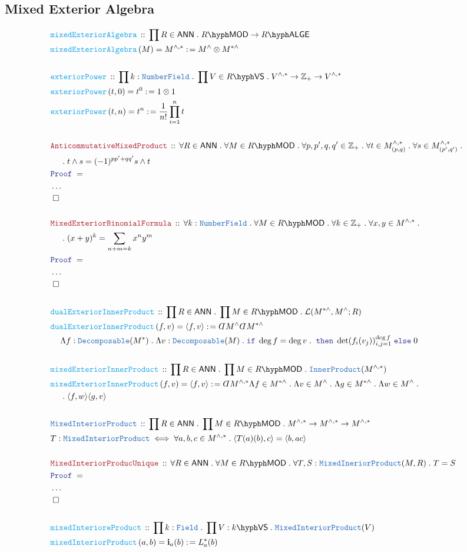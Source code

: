 \documentclass[12pt]{scrartcl}%
\newcommand{\TYPE}[1]{\textcolor{NavyBlue}{\mathtt{#1}}}%
\newcommand{\FUNC}[1]{\textcolor{Cerulean}{\mathtt{#1}}}%
\newcommand{\LOGIC}[1]{\textcolor{Blue}{\mathtt{#1}}}%
\newcommand{\THM}[1]{\textcolor{Maroon}{\mathtt{#1}}}%
\renewcommand{\.}{\; . \;} %
\newcommand{\de}{: \kern 0.1pc =} %
\newcommand{\If}{\LOGIC{if} \;} %
\newcommand{\Then}{ \; \LOGIC{then} \;} %
\newcommand{\Else}{\; \LOGIC{else} \;} %
\newcommand{\Act}[1]{\left( #1 \right)} %
\newcommand{\Theorem}[2]{& \THM{#1} \, :: \, #2 \\ & \Proof = \\ } %
\newcommand{\DeclareType}[2]{& \TYPE{#1} \, :: \, #2 \\}%
\newcommand{\DefineType}[3]{& #1 : \TYPE{#2} \iff #3 \\}%
\newcommand{\DeclareFunc}[2]{& \FUNC{#1} \, :: \, #2 \\}%
\newcommand{\DefineNamedFunc}[4]{&  \FUNC{#1}\Act{#2} = #3 \de #4 \\}%
\newcommand{\NewLine}{\\ & \kern 1pc}%
\newcommand{\Page}[1]{ \begin{align*} #1 \end{align*}  }%
\newcommand{ \bd }{ \ByDef }%
\newcommand{\NoProof}{ & \ldots \\ \EndProof}%
\newcommand{\Int}{\mathbb{Z}}%
\newcommand{\QED}{\; \square} %
\newcommand{\EndProof}{& \QED \\} %
\newcommand{\ByDef}{\rotatebox[origin=c]{-180}{$D$}}%
\newcommand{\Proof}{\LOGIC{Proof} \; } %
\newcommand{\VS}[1]{#1\hyph\mathsf{VS}} %
\newcommand{\LMOD}[1]{#1\hyph\mathsf{MOD}} %
\renewcommand{\L}{\mathcal{L}}
\newcommand{\Field}{\TYPE{Field}}
\newcommand{\ANN}{\mathsf{ANN}} %
\newcommand{\LALGE}[1]{#1\hyph\mathsf{ALGE}}%
\begin{document}
\subsection{Mixed Exterior Algebra}
\Page{
	\DeclareFunc{mixedExteriorAlgebra}{\prod R \in \ANN \. \LMOD{R} \to \LALGE{R}}
	\DefineNamedFunc{mixedExteriorAlgebra}{M}{M^{\wedge,*}}{ M^\wedge \otimes M^{*\wedge} }
	\\
	\DeclareFunc{exteriorPower}{\prod k  : \TYPE{NumberField}  \. \prod V \in \VS{R} \.  V^{\wedge,*} \to \Int_+ \to V^{\wedge,*}}
	\DefineNamedFunc{exteriorPower}{t,0}{t^0}{1\otimes 1}
	\DefineNamedFunc{exteriorPower}{t,n}{t^n}{\frac{1}{n!}\prod^n_{i=1} t} 
	\\
	\Theorem{AnticommutativeMixedProduct}
	{
		\forall R \in \ANN \. 
		\forall M \in \LMOD{R} \. 
		\forall p,p',q,q' \in \Int_+ \.
		\forall t \in M^{\wedge,*}_{(p,q)} \.
		\forall s \in M^{\wedge,*}_{(p',q')} \. \NewLine \.  
		t \wedge s = (-1)^{pp' + qq'} s \wedge t
	}
	\NoProof
	\\
	\Theorem{MixedExteriorBinomialFormula}
	{
		\forall k : \TYPE{NumberField} \. 
		\forall M \in \LMOD{R} \. 
		\forall k \in \Int_+ \.
		\forall x,y \in M^{\wedge,*} 
		\. \NewLine \. 
		(x + y)^k = \sum_{n+m=k} x^ny^m
	}
	\NoProof
	\\
	\DeclareFunc{dualExteriorInnerProduct}{ \prod R  \in \ANN \. \prod M \in \LMOD{R} \. \L( M^{*\wedge},M^\wedge;R) }
	\DefineNamedFunc{dualExteriorInnerProduct}{ f,v  }{ \langle f, v \rangle }
	{
		\bd M^{\wedge}\bd M^{*\wedge} \NewLine 
		\Lambda f : \TYPE{Decomposable}(M^{*}) \.
		\Lambda v : \TYPE{Decomposable}(M) \. 
		\If \deg f = \deg v \. 
		\Then \det (f_i(v_j))^{\deg f}_{i,j=1} 
		\Else 0 
	}
	\\
	\DeclareFunc{mixedExteriorInnerProduct}{ \prod R  \in \ANN \. \prod M \in \LMOD{R} \. \TYPE{InnerProduct}( M^{\wedge,*}) }
	\DefineNamedFunc{mixedExteriorInnerProduct}{ f,v  }{ \langle f, v \rangle }
	{
		\bd M^{\wedge,*} 
		\Lambda f  \in M^{*\wedge} \.
		\Lambda v  \in M^\wedge \. 
		\Lambda g \in M^{*\wedge} \.
		\Lambda w \in M^{\wedge} \. \NewLine \.  
		\langle f,w\rangle\langle g, v \rangle
	}
	\\
	\DeclareType{MixedInteriorProduct}
	{
		\prod R \in \ANN \.
		\prod M \in \LMOD{R} \. 
		M^{\wedge,*} \to M^{\wedge,*} \to M^{\wedge,*} 
	}
	\DefineType{T}{MixedInteriorProduct}{ \forall a,b,c \in M^{\wedge,*} \. \langle T(a)(b), c \rangle = \langle b , ac \rangle  }
	\\
	\Theorem{MixedInteriorProducUnique}{\forall R \in \ANN \. \forall M \in \LMOD{R} \. \forall T,S : \TYPE{MixedIneriorProduct}(M,R) \. T = S}
	\NoProof
	\\
	\DeclareFunc{mixedInterioreProduct}
	{
		\prod k : \Field \. 
		\prod V : \VS{k} \.
		\TYPE{MixedInteriorProduct}(V)
	}
	\DefineNamedFunc{mixedInteriorProduct}{a,b}{\mathbf{i}_a(b)}{L_a^\star(b)}
}
\end{document}
